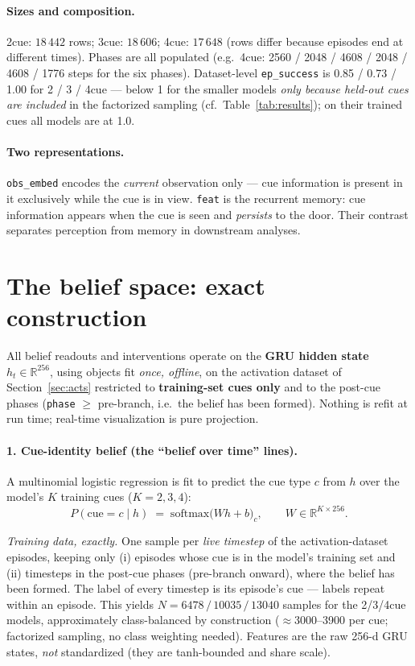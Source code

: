 \documentclass[11pt]{article}
\begin{document}
\paragraph{Sizes and composition.}
2cue: $18\,442$ rows; 3cue: $18\,606$; 4cue: $17\,648$ (rows differ because episodes end at
different times). Phases are all populated (e.g.\ 4cue: 2560 / 2048 / 4608 / 2048 / 4608 / 1776
steps for the six phases). Dataset-level \texttt{ep\_success} is 0.85 / 0.73 / 1.00 for
2 / 3 / 4cue --- below 1 for the smaller models \emph{only because held-out cues are included} in
the factorized sampling (cf.\ Table~\ref{tab:results}); on their trained cues all models are at
1.0.

\paragraph{Two representations.} \texttt{obs\_embed} encodes the \emph{current} observation only
--- cue information is present in it exclusively while the cue is in view. \texttt{feat} is the
recurrent memory: cue information appears when the cue is seen and \emph{persists} to the door.
Their contrast separates perception from memory in downstream analyses.

\section{The belief space: exact construction}
\label{sec:beliefspace}

All belief readouts and interventions operate on the \textbf{GRU hidden state}
$h_t \in \mathbb{R}^{256}$, using objects fit \emph{once, offline}, on the activation dataset of
Section~\ref{sec:acts} restricted to \textbf{training-set cues only} and to the post-cue phases
(\texttt{phase} $\geq$ pre-branch, i.e.\ the belief has been formed). Nothing is refit at run
time; real-time visualization is pure projection.

\paragraph{1. Cue-identity belief (the ``belief over time'' lines).} A multinomial logistic
regression is fit to predict the cue type $c$ from $h$ over the model's $K$ training cues
($K{=}2,3,4$):
\[
P(\text{cue}=c \mid h) \;=\; \mathrm{softmax}\big(W h + b\big)_c , \qquad W \in \mathbb{R}^{K\times 256}.
\]

\emph{Training data, exactly.} One sample per \emph{live timestep} of the activation-dataset
episodes, keeping only (i) episodes whose cue is in the model's training set and (ii) timesteps
in the post-cue phases (pre-branch onward), where the belief has been formed. The label of every
timestep is its episode's cue --- labels repeat within an episode. This yields
$N = 6478\,/\,10035\,/\,13040$ samples for the 2/3/4cue models, approximately class-balanced by
construction ($\approx$3000--3900 per cue; factorized sampling, no class weighting needed).
Features are the raw 256-d GRU states, \emph{not} standardized (they are tanh-bounded and share
scale).
\end{document}
